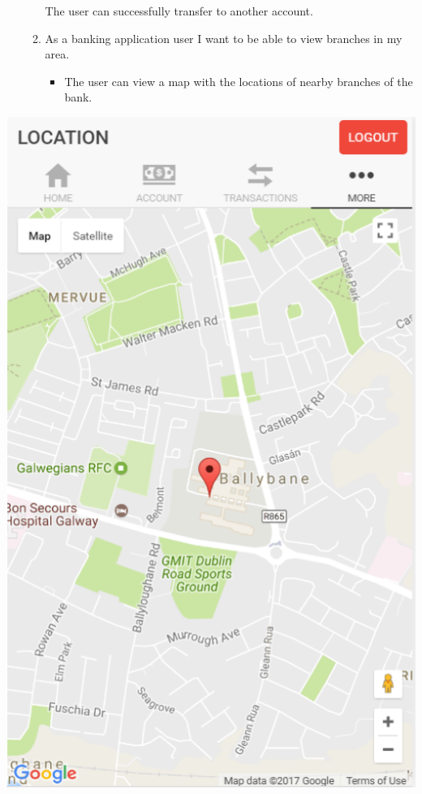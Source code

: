 \begin{itemize}
\begin{enumerate}
\begin{center}
\end{center}
        The user can successfully transfer to another account.
        \item As a banking application user I want to be able to view branches in my area.
            \begin{itemize}
                \item The user can view a map with the locations of nearby branches of the bank.
            \end{itemize}
        \end{enumerate}
    \end{itemize}
\begin{center}
    \includegraphics[scale=0.5]{img/Locations.png}
\end{center}

